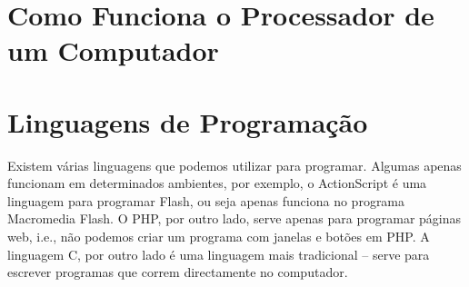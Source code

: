\section{Como Funciona o Processador de um Computador}




\section{Linguagens de Programação}
Existem várias linguagens que podemos utilizar para programar. Algumas apenas funcionam em determinados ambientes, por exemplo, o ActionScript é uma linguagem para programar Flash, ou seja apenas funciona no programa Macromedia Flash.
O PHP, por outro lado, serve apenas para programar páginas web, i.e., não podemos criar um programa com janelas e botões em PHP.
A linguagem C, por outro lado é uma linguagem mais tradicional -- serve para escrever programas que correm directamente no computador.

